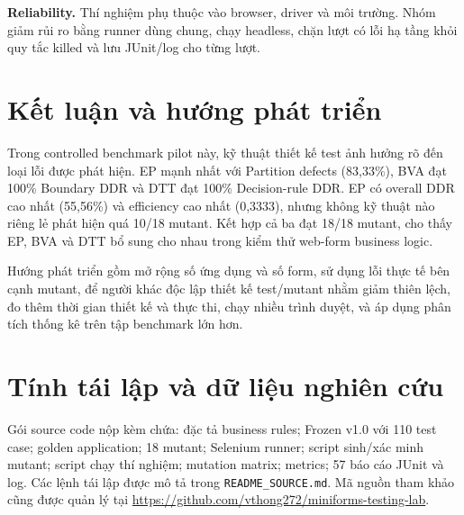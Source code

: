 \documentclass[runningheads]{llncs}
\begin{document}
\textbf{Reliability.} Thí nghiệm phụ thuộc vào browser, driver và môi trường. Nhóm giảm rủi ro bằng runner dùng chung, chạy headless, chặn lượt có lỗi hạ tầng khỏi quy tắc killed và lưu JUnit/log cho từng lượt.

\section{Kết luận và hướng phát triển}
\label{sec:conclusion}

Trong controlled benchmark pilot này, kỹ thuật thiết kế test ảnh hưởng rõ đến loại lỗi được phát hiện. EP mạnh nhất với Partition defects (83,33\%), BVA đạt 100\% Boundary DDR và DTT đạt 100\% Decision-rule DDR. EP có overall DDR cao nhất (55,56\%) và efficiency cao nhất (0,3333), nhưng không kỹ thuật nào riêng lẻ phát hiện quá 10/18 mutant. Kết hợp cả ba đạt 18/18 mutant, cho thấy EP, BVA và DTT bổ sung cho nhau trong kiểm thử web-form business logic.

Hướng phát triển gồm mở rộng số ứng dụng và số form, sử dụng lỗi thực tế bên cạnh mutant, để người khác độc lập thiết kế test/mutant nhằm giảm thiên lệch, đo thêm thời gian thiết kế và thực thi, chạy nhiều trình duyệt, và áp dụng phân tích thống kê trên tập benchmark lớn hơn.

\section*{Tính tái lập và dữ liệu nghiên cứu}

Gói source code nộp kèm chứa: đặc tả business rules; Frozen v1.0 với 110 test case; golden application; 18 mutant; Selenium runner; script sinh/xác minh mutant; script chạy thí nghiệm; mutation matrix; metrics; 57 báo cáo JUnit và log. Các lệnh tái lập được mô tả trong \texttt{README\_SOURCE.md}. Mã nguồn tham khảo cũng được quản lý tại \url{https://github.com/vthong272/miniforms-testing-lab}.



\end{document}
